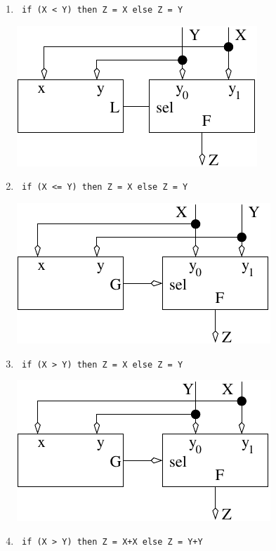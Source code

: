 \begin{enumerate}
\begin{enumerate}
\item \verb^ if (X < Y) then Z = X else Z = Y ^

\begin{solution}{
\includegraphics{./FigHw4/Sol4-8g}
} \end{solution}

\item \verb^ if (X <= Y) then Z = X else Z = Y ^

\begin{solution}{
\includegraphics{./FigHw4/Sol4-8h}
} \end{solution}

\item \verb^ if (X > Y) then Z = X else Z = Y ^

\begin{solution}{
\includegraphics{./FigHw4/Sol4-8i}
} \end{solution}

\item \verb^ if (X > Y) then Z = X+X else Z = Y+Y ^


\end{enumerate}
\end{enumerate}
